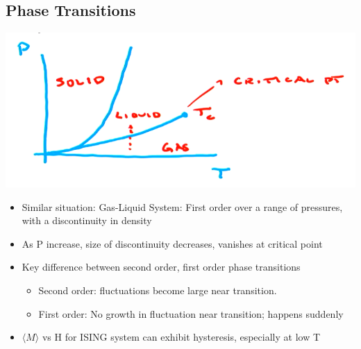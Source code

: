 \subsection{Phase Transitions}

\begin{center}
    \includegraphics[width = 0.5\linewidth]{Images/phase_transtion_PT.png}
\end{center}

\begin{itemize}
    \item Similar situation: Gas-Liquid System: First order over a range of pressures, with a discontinuity in density
    \item As P increase, size of discontinuity decreases, vanishes at critical point
    \item Key difference between second order, first order phase transitions
    \begin{itemize}
        \item Second order: fluctuations become large near transition.
        \item First order: No growth in fluctuation near transition; happens suddenly
    \end{itemize}

    \item $\langle M \rangle $ vs H for ISING system can exhibit hysteresis, especially at low T
\end{itemize}
